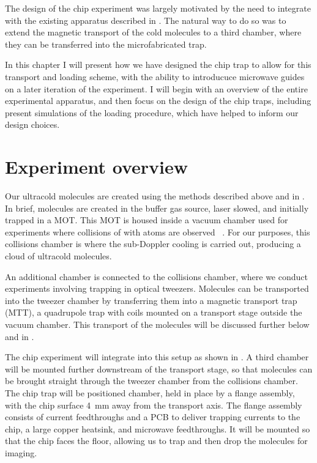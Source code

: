 The design of the \CaF{} chip experiment was largely motivated by the need to
integrate with the existing apparatus described in \cite{}.
The natural way to do so was to extend the magnetic transport of the cold
molecules to a third chamber, where they can be transferred into the
microfabricated trap.

In this chapter I will present how we have designed the chip trap to allow for
this transport and loading scheme, with the ability to introducuce microwave
guides on a later iteration of the experiment. I will begin with an overview of
the entire experimental apparatus, and then focus on the design of the chip
traps, including present simulations of the loading procedure, which have
helped to inform our design choices.

\section{Experiment overview}


%

Our ultracold molecules are created using the methods described above and in
. In brief, molecules are created in the buffer gas source,
laser slowed, and initially trapped in a MOT. This MOT is housed inside a
vacuum chamber used for experiments where collisions of \CaF{} with \Rb{} atoms
are observed ~\cite{}.  For our purposes, this collisions chamber is where the
sub-Doppler cooling is carried out, producing a cloud of ultracold molecules.


An additional chamber is connected to the collisions chamber, where we conduct
experiments involving trapping \CaF{} in optical tweezers. Molecules can be
transported into the tweezer chamber by transferring them into a magnetic
transport trap (MTT), a quadrupole trap with coils mounted on a transport stage
outside the vacuum chamber. This transport of the molecules will be discussed
further below and in .
%

The chip experiment will integrate into this setup as shown in
. A third chamber will be mounted
further downstream of the transport stage, so that molecules can be brought
straight through the tweezer chamber from the collisions chamber.
The chip trap will be positioned chamber, held in place by a flange
assembly, with the chip surface \SI{4}{\milli\meter}
%
%
away from the transport axis. The flange assembly consists of current
feedthroughs and a PCB to deliver trapping currents to the chip, a large copper
heatsink, and microwave feedthroughs. It will be mounted so that the chip
faces the floor, allowing us to trap and then drop the molecules for imaging.

